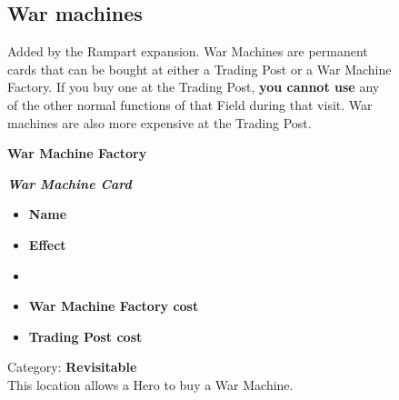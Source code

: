 \begin{figure}[h]
  \begin{minipage}[t]{0.5\textwidth}
    \vspace{0pt}
    \subsection*{War machines}
    Added by the Rampart expansion.
    War Machines are permanent cards that can be bought at either a Trading Post or a War Machine Factory.
    If you buy one at the Trading Post, \textbf{you cannot use} any of the other normal functions of that Field during that visit.
    War machines are also more expensive at the Trading Post.\par
    \medskip
    \raggedright\textbf{War Machine Factory}\medskip
      \caption{\scriptsize Category: \scriptsize\textbf{Revisitable}\\This location allows a Hero to buy a War Machine.}
  \end{minipage}
  \begin{minipage}[t]{0.4\textwidth}
    \vspace{0pt}
    \centering
    \begin{scriptsize}
    \end{scriptsize}
    \break
    \footnotesize{\textbf{\textit{\textcolor{darkcandyapplered}{War Machine Card}}}}
    \scriptsize
    \begin{multicols}{2}
      \begin{itemize}
        \item[\textbf{1.}] \textbf{Name}
        \item[\textbf{2.}] \textbf{Effect}
        \item[\textbf{\phantom{.}}] \phantom{.}
        \item[\textbf{3.}] \textbf{War Machine Factory cost}
        \item[\textbf{4.}] \textbf{Trading Post cost}
      \end{itemize}
    \end{multicols}
  \end{minipage}
\end{figure}

